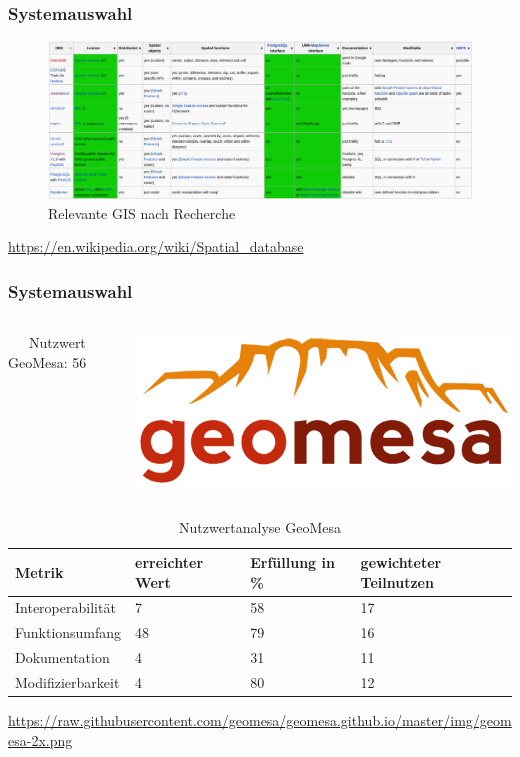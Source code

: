 \documentclass{beamer}
\begin{document}
\begin{frame}\frametitle{Systemauswahl}
\begin{figure}
\centering
\includegraphics[width=1\hsize]{spatial_databases.png}
\caption{Relevante GIS nach Recherche}
\end{figure}
\begin{center}
\tiny
\url{https://en.wikipedia.org/wiki/Spatial_database}
\end{center}
\end{frame}

\begin{frame}\frametitle{Systemauswahl}

   \begin{columns}
    \begin{column}{.5\textwidth}
\ \ \ Nutzwert GeoMesa: 56
    \end{column}
    \begin{column}{.5\textwidth}
    \includegraphics[width=.7\hsize]{geomesa.png}
    \end{column}
  \end{columns}

\begin{table}
\begin{tabular}{|l|p{1.8cm}|l|p{1.9cm}|}
\hline
\textbf{Metrik} & \textbf{erreichter Wert} & \textbf{Erfüllung in \%} & \textbf{gewichteter Teilnutzen} \\ \hline
Interoperabilität & 7 & 58 & 17 \\ \hline
Funktionsumfang & 48 & 79 & 16 \\ \hline
Dokumentation & 4 & 31 & 11 \\ \hline
Modifizierbarkeit & 4 & 80 & 12 \\ \hline
\end{tabular}
\caption{Nutzwertanalyse GeoMesa}
\end{table}

\begin{center}
\tiny
\url{https://raw.githubusercontent.com/geomesa/geomesa.github.io/master/img/geomesa-2x.png}
\end{center}

\end{frame}
\end{document}
